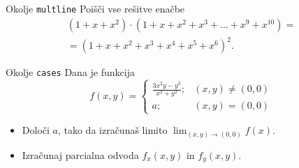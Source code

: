 \begin{frame}{Okolje \texttt{multline}}
	Poišči vse rešitve enačbe
	\begin{multline*}
	(1+x+x^2) \cdot (1+x+x^2+x^3+\ldots+x^9+x^{10}) = \\
	=(1+x+x^2+x^3+x^4+x^5+x^6)^2.
	\end{multline*}
\end{frame}

\begin{frame}{Okolje \texttt{cases}}
	Dana je funkcija
	\[
		f(x,y) = 
		\begin{cases}
			\frac{3x^2y-y^3}{x^2+y^2} ;& (x,y) \neq (0,0) \\
			a;& (x,y) = (0,0)
		\end{cases}
	\]
	\begin{itemize}
	\item Določi $a$, tako da izračunaš limito \( \lim_{(x,y)\to(0,0)} f(x). \)
	\item Izračunaj parcialna odvoda $f_x(x,y)$ in $f_y(x,y)$.
	\end{itemize}
\end{frame}
